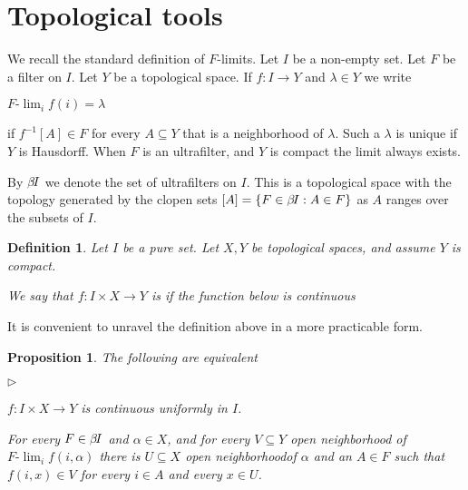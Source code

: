 \documentclass[12pt,letterpaper,oneside,reqno]{amsart}
\newcommand{\mylabel}[1]{{#1}\hfill}
\renewenvironment{itemize}
  {\begin{list}{$\triangleright$}{%
   \setlength{\parskip}{0mm}
   \setlength{\topsep}{.2\baselineskip}
   \setlength{\rightmargin}{0mm}
   \setlength{\listparindent}{0mm}
   \setlength{\itemindent}{0mm}
   \setlength{\labelwidth}{3ex}
   \setlength{\itemsep}{.2\baselineskip}
   \setlength{\parsep}{.2\baselineskip}
   \setlength{\partopsep}{0mm}
   \setlength{\labelsep}{1ex}
   \setlength{\leftmargin}{\labelwidth+\labelsep}
   \let\makelabel\mylabel}}{%
   \end{list}}
\theoremstyle{plain}
\newtheorem{proposition}[theorem]{Proposition}
\newtheorem{definition}[theorem]{Definition}
\theoremstyle{remark}
\renewcommand*{\emph}[1]{%
   \smash{\tikz[baseline]\node[rectangle, fill=olive!25, rounded corners, inner xsep=0.5ex, inner ysep=0.2ex, anchor=base, minimum height = 2.7ex]{#1};}}
\begin{document}
\section{Topological tools}\label{topology}

We recall the standard definition of $F$-limits.
Let $I$ be a non-empty set.
Let $F$ be a filter on $I$.
Let $Y$ be a topological space.
If $f:I\to Y$ and $\lambda\in Y$ we write

\hfil$\displaystyle F\mbox{-}\lim_{i}f(i)=\lambda$

if $f^{-1}[A]\in F$ for every $A\subseteq Y$ that is a neighborhood of $\lambda$.
Such a $\lambda$ is unique if $Y$ is Hausdorff.
When $F$ is an ultrafilter, and $Y$ is compact the limit always exists.

By $\beta\kern-1.5pt I$ we denote the set of ultrafilters on $I$. This is a topological space with the topology generated by the clopen sets $[A]=\{F\in\beta\kern-1.5pt I: A\in F\}$ as $A$ ranges over the subsets of $I$.

\begin{definition}\label{def_unif_cont}
  Let $I$ be a pure set. Let $X,Y$ be topological spaces, and assume $Y$ is compact. 
  
  We say that $f:I\times X\to Y$ is \emph{continuous uniformly in $I$} if the function below is continuous
  

\end{definition}

It is convenient to unravel the definition above in a more practicable form.

\begin{proposition}\label{prop_uc_esplicito}
  The following are equivalent
  \begin{itemize}
    \item[1.] $f:I\times X\to Y$ is continuous uniformly in $I$.
    \item[2.] For every $F\in\beta\kern-1.5pt I$ and $\alpha\in X$, and for every $V\subseteq Y$ open neighborhood of $F\mbox{-}\lim_{i}f(i,\alpha)$ there is $U\subseteq X$ open neighborhoodof $\alpha$ and an $A\in F$ such that $f(i,x)\in V$ for every $i\in A$ and every $x\in U$.
  \end{itemize}
\end{proposition}
\end{document}
